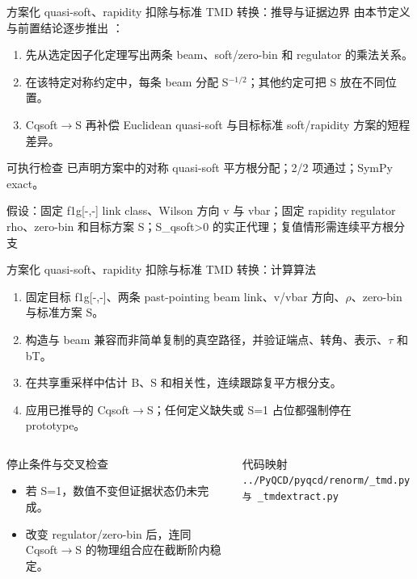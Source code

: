 \begin{frame}[t]{方案化 quasi-soft、rapidity 扣除与标准 TMD 转换：推导与证据边界}
\footnotesize
{}\quad 由本节定义与前置结论逐步推出 ：
\begin{enumerate}
\item 先从选定因子化定理写出两条 beam、soft/\allowbreak{}zero-bin 和 regulator 的乘法关系。
\item 在该特定对称约定中，每条 beam 分配 S\ensuremath{^{-1/2}}；其他约定可把 S 放在不同位置。
\item Cqsoft\ensuremath{\rightarrow}S 再补偿 Euclidean quasi-soft 与目标标准 soft/\allowbreak{}rapidity 方案的短程差异。
\end{enumerate}\begin{block}{可执行检查}
\quad 已声明方案中的对称 quasi-soft 平方根分配；2/2 项通过；SymPy exact。
\par\scriptsize 假设：固定 f1g[-,-] link class、Wilson 方向 v 与 vbar；固定 rapidity regulator rho、zero-bin 和目标方案 S；S\_qsoft>0 的实正代理；复值情形需连续平方根分支
\end{block}
\end{frame}

\begin{frame}[t]{方案化 quasi-soft、rapidity 扣除与标准 TMD 转换：计算算法}
\footnotesize
{}\begin{enumerate}
\item 固定目标 f1g[-,-]、两条 past-pointing beam link、v/\allowbreak{}vbar 方向、\ensuremath{\rho}、zero-bin 与标准方案 S。
\item 构造与 beam 兼容而非简单复制的真空路径，并验证端点、转角、表示、\ensuremath{\tau} 和 bT。
\item 在共享重采样中估计 B、S 和相关性，连续跟踪复平方根分支。
\item 应用已推导的 Cqsoft\ensuremath{\rightarrow}S；任何定义缺失或 S=1 占位都强制停在 prototype。
\end{enumerate}\begin{columns}[T,onlytextwidth]
\begin{block}{停止条件与交叉检查}\scriptsize\begin{itemize}
\item[\CheckMark] 若 S=1，数值不变但证据状态仍未完成。
\item[\CheckMark] 改变 regulator/\allowbreak{}zero-bin 后，连同 Cqsoft\ensuremath{\rightarrow}S 的物理组合应在截断阶内稳定。
\end{itemize}\end{block}
\begin{block}{代码映射}
\scriptsize \texttt{.\allowbreak{}.\allowbreak{}/\allowbreak{}PyQCD/\allowbreak{}pyqcd/\allowbreak{}renorm/\allowbreak{}\_\allowbreak{}tmd.\allowbreak{}py 与 \_\allowbreak{}tmdextract.\allowbreak{}py}
\end{block}\end{columns}\end{frame}

